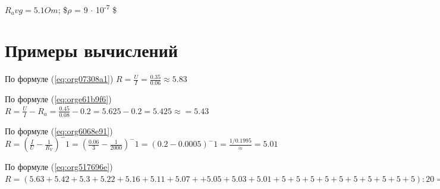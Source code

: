 \documentclass[14pt]{extarticle}
\begin{document}
\(R_avg = 5.1 Om\); \$\(\rho\) = 9 \(\cdot\) 10\textsuperscript{-7} \$


\section{Примеры вычислений}
\label{sec:org06b33c4}

По формуле (\ref{eq:org07308a1}) \(R = \frac{U}{I} = \frac{0.35}{0.06} \approx 5.83\)

По формуле (\ref{eq:orge61b9f6}) \(R = \frac{U}{I} - R_a = \frac{0.45}{0.08} - 0.2 = 5.625 - 0.2 = 5.425 \approx = 5.43\)

По формуле (\ref{eq:org6068e91}) \(R = (\frac{I}{U} - \frac{1}{R_V})^-1 = (\frac{0.06}{3} - \frac{1}{2000})^-1  = (0.2 - 0.0005)^-1 = \frac{1/0.1995} \approx = 5.01\)

По формуле (\ref{eq:org517696e}) \(R = (5.63+5.42+5.3+5.22+5.16+5.11+5.07 + + 5.05+5.03+5.01+5+5+5+5+5+5+5+5+5+5) : 20 = \frac{102}{20} = 5.1\)
\end{document}
